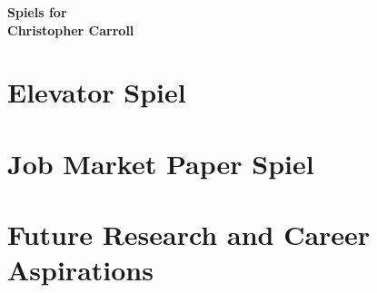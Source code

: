\documentclass[11pt]{article}
\begin{document}
\begin{center}
{\Large {\bf Spiels for }}
\\[5pt]
{\large {\bf Christopher Carroll}}
\end{center}

\vspace{.3cm}

\section{\large Elevator Spiel} %

\section{\large Job Market Paper Spiel} %

\section{\large Future Research and Career Aspirations} %
\end{document}
